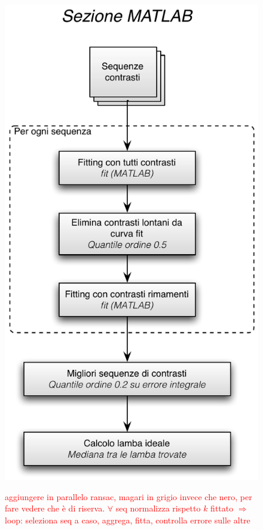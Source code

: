 \documentclass[12pt]{report}
\begin{document}
\begin{figure}[H]
	\centering
	\includegraphics[scale=0.7]{images/schemaMatlab.pdf} 
	\label{diag:high}
	\caption{\textcolor{red}{aggiungere in parallelo ransac, magari in grigio invece che nero, per fare vedere che \`e di riserva. $\forall$ seq normalizza rispetto $k$ fittato $\Rightarrow$ loop: seleziona seq a caso, aggrega, fitta, controlla errore sulle altre}}
\end{figure}
\end{document}
